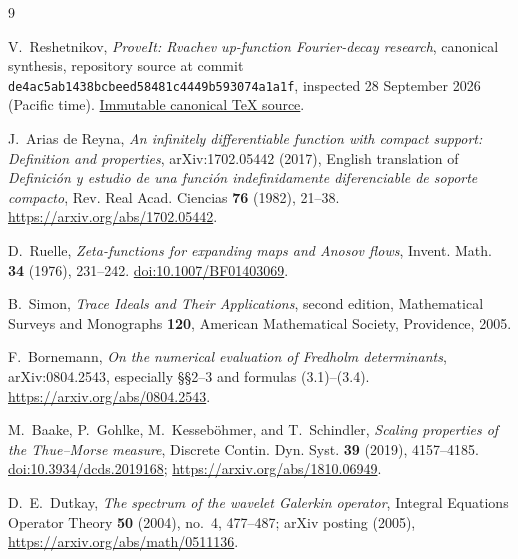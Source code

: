 \documentclass[11pt,a4paper]{article}
\theoremstyle{definition}
\theoremstyle{remark}
\numberwithin{equation}{section}
\begin{document}
\begin{thebibliography}{9}\raggedright
{}
V.~Reshetnikov, \emph{ProveIt: Rvachev up-function Fourier-decay research},
canonical synthesis, repository source at commit
\texttt{de4ac5ab1438bcbeed58481c4449b593074a1a1f}, inspected
28 September 2026 (Pacific time).
\href{https://github.com/VladimirReshetnikov/ProveIt/blob/de4ac5ab1438bcbeed58481c4449b593074a1a1f/Analysis/FabiusFunction/docs/semi-formalized-research-frontiers/drafts/rvachev_up_fourier_decay/Rvachev_Up_Fourier_Decay/Rvachev_Up_Fourier_Decay.tex}{Immutable canonical TeX source}.

J.~Arias de Reyna, \emph{An infinitely differentiable function with compact
support: Definition and properties}, arXiv:1702.05442 (2017), English
translation of \emph{Definici\'on y estudio de una funci\'on indefinidamente
diferenciable de soporte compacto}, Rev. Real Acad. Ciencias \textbf{76}
(1982), 21--38. \url{https://arxiv.org/abs/1702.05442}.

D.~Ruelle, \emph{Zeta-functions for expanding maps and Anosov flows},
Invent. Math. \textbf{34} (1976), 231--242.
\href{https://doi.org/10.1007/BF01403069}{doi:10.1007/BF01403069}.

B.~Simon, \emph{Trace Ideals and Their Applications}, second edition,
Mathematical Surveys and Monographs \textbf{120}, American Mathematical
Society, Providence, 2005.

F.~Bornemann, \emph{On the numerical evaluation of Fredholm determinants},
arXiv:0804.2543, especially \S\S2--3 and formulas (3.1)--(3.4).
\url{https://arxiv.org/abs/0804.2543}.

M.~Baake, P.~Gohlke, M.~Kesseb\"ohmer, and T.~Schindler,
\emph{Scaling properties of the Thue--Morse measure},
Discrete Contin. Dyn. Syst. \textbf{39} (2019), 4157--4185.
\href{https://doi.org/10.3934/dcds.2019168}{doi:10.3934/dcds.2019168};
\url{https://arxiv.org/abs/1810.06949}.

D.~E.~Dutkay, \emph{The spectrum of the wavelet Galerkin operator},
Integral Equations Operator Theory \textbf{50} (2004), no.~4, 477--487;
arXiv posting (2005), \url{https://arxiv.org/abs/math/0511136}.
\end{thebibliography}
\end{document}
